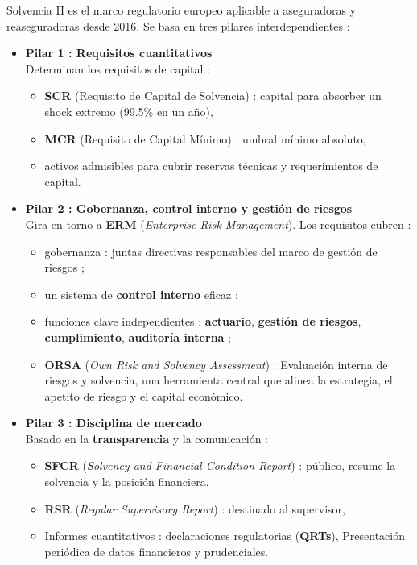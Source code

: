 	
\begin{f}
	
	Solvencia II es el marco regulatorio europeo aplicable a aseguradoras y reaseguradoras desde 2016. Se basa en tres pilares interdependientes :
	
	\begin{itemize}
		\item \textbf{Pilar 1 : Requisitos cuantitativos} \\
		Determinan los requisitos de capital :
		\begin{itemize}
			\item \textbf{SCR} (Requisito de Capital de Solvencia) : capital para absorber un shock extremo (99.5\% en un año),
			\item \textbf{MCR} (Requisito de Capital Mínimo) : umbral mínimo absoluto,
			\item activos admisibles para cubrir reservas técnicas y requerimientos de capital.
		\end{itemize}
		
		\item \textbf{Pilar 2 : Gobernanza, control interno y gestión de riesgos} \\
		Gira en torno a \textbf{ERM} (\emph{Enterprise Risk Management}). Los requisitos cubren :
		\begin{itemize}
			\item gobernanza : juntas directivas responsables del marco de gestión de riesgos ;
			\item un sistema de \textbf{control interno} eficaz ;
			\item funciones clave independientes : \textbf{actuario}, \textbf{gestión de riesgos}, \textbf{cumplimiento}, \textbf{auditoría interna} ;
			\item \textbf{ORSA} (\emph{Own Risk and Solvency Assessment}) : Evaluación interna de riesgos y solvencia, una herramienta central que alinea la estrategia, el apetito de riesgo y el capital económico.
		\end{itemize}
		
		\item \textbf{Pilar 3 : Disciplina de mercado} \\
		Basado en la \textbf{transparencia} y la comunicación :
		\begin{itemize}
			\item \textbf{SFCR} (\emph{Solvency and Financial Condition Report}) : público, resume la solvencia y la posición financiera,
			\item \textbf{RSR} (\emph{Regular Supervisory Report}) : destinado al supervisor,
			\item Informes cuantitativos : declaraciones regulatorias (\textbf{QRTs}), Presentación periódica de datos financieros y prudenciales.
		\end{itemize}
	\end{itemize}
		
\end{f}
